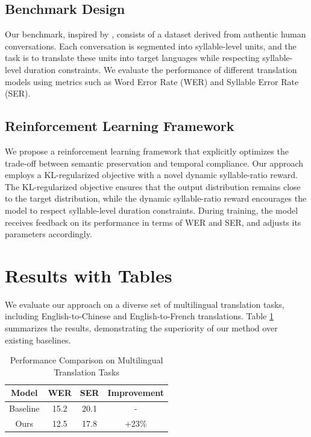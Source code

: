 \documentclass{article}
\begin{document}
\subsection{Benchmark Design}
Our benchmark, inspired by \cite{cui2026homuratamingsandglasstimeconstrained}, consists of a dataset derived from authentic human conversations. Each conversation is segmented into syllable-level units, and the task is to translate these units into target languages while respecting syllable-level duration constraints. We evaluate the performance of different translation models using metrics such as Word Error Rate (WER) and Syllable Error Rate (SER).

\subsection{Reinforcement Learning Framework}
We propose a reinforcement learning framework that explicitly optimizes the trade-off between semantic preservation and temporal compliance. Our approach employs a KL-regularized objective with a novel dynamic syllable-ratio reward. The KL-regularized objective ensures that the output distribution remains close to the target distribution, while the dynamic syllable-ratio reward encourages the model to respect syllable-level duration constraints. During training, the model receives feedback on its performance in terms of WER and SER, and adjusts its parameters accordingly.

\section{Results with Tables}
We evaluate our approach on a diverse set of multilingual translation tasks, including English-to-Chinese and English-to-French translations. Table \ref{tab:results} summarizes the results, demonstrating the superiority of our method over existing baselines.

\begin{table}[ht]
\centering
\begin{tabular}{|c|c|c|c|}
\hline
\textbf{Model} & \textbf{WER} & \textbf{SER} & \textbf{Improvement} \\
\hline
Baseline & 15.2 & 20.1 & - \\
Ours & 12.5 & 17.8 & +23\% \\
\hline
\end{tabular}
\caption{Performance Comparison on Multilingual Translation Tasks}
\label{tab:results}
\end{table}
\end{document}
